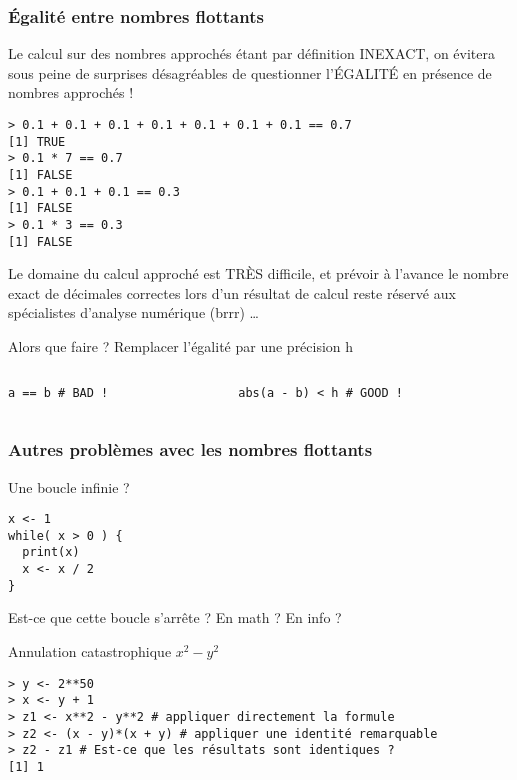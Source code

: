 \documentclass[10pt]{beamer}
\begin{document}

\begin{frame}[fragile]
  \frametitle{Égalité entre nombres flottants}
  Le calcul sur des nombres approchés étant par définition \alert{INEXACT}, on évitera sous peine de surprises désagréables de questionner l'\alert{ÉGALITÉ} en présence de nombres approchés !
  \begin{lstlisting}
> 0.1 + 0.1 + 0.1 + 0.1 + 0.1 + 0.1 + 0.1 == 0.7
[1] TRUE
> 0.1 * 7 == 0.7
[1] FALSE
> 0.1 + 0.1 + 0.1 == 0.3
[1] FALSE
> 0.1 * 3 == 0.3
[1] FALSE
\end{lstlisting}

Le domaine du calcul approché est TRÈS difficile, et prévoir à l'avance le nombre exact de décimales correctes lors d'un résultat de calcul reste réservé aux spécialistes d'analyse numérique (brrr) \dots

\begin{block}{Alors que faire ? Remplacer l'égalité par une précision h}
\begin{columns}[t]
\begin{column}{0.48\textwidth}
  \begin{lstlisting}[style=editor]
a == b # BAD !
  \end{lstlisting}
\end{column}
\begin{column}{0.48\textwidth}
  \begin{lstlisting}[style=editor]
abs(a - b) < h # GOOD !
  \end{lstlisting}
\end{column}
\end{columns}
\end{block}
\end{frame}

\begin{frame}[fragile]
  \frametitle{Autres problèmes avec les nombres flottants}


  \begin{exampleblock}{Une boucle infinie ?}
  \begin{lstlisting}[style=edblock]
x <- 1
while( x > 0 ) {
  print(x)
  x <- x / 2
}
\end{lstlisting}
Est-ce que cette boucle s'arrête ? En math ? En info ?
\end{exampleblock}


\begin{exampleblock}{Annulation catastrophique $x^2 - y^2$}
  \begin{lstlisting}[style=block]
> y <- 2**50
> x <- y + 1
> z1 <- x**2 - y**2 # appliquer directement la formule
> z2 <- (x - y)*(x + y) # appliquer une identité remarquable
> z2 - z1 # Est-ce que les résultats sont identiques ?
[1] 1
  \end{lstlisting}
\end{exampleblock}

\end{frame}
\end{document}
